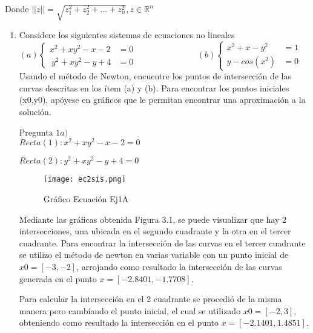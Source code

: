 \documentclass{udpreport}
\begin{document}
        Donde $||z||=\sqrt{z_{1}^{2} + z_{2}^2+...+z_{n}^{2}} , z \in \mathbb{R}^{n}$
    \begin{enumerate}   
        
        \item Considere los siguientes sistemas de ecuaciones no lineales\\
        
        \begin{math}
            (a)\left\lbrace
          \begin{array}{ll}
                x^2 + xy^2-x-2&=0 \\\
                y^2 + xy^2-y+4&=0
            \end{array}
            \right.
            \hspace{3cm}
            (b) \left\lbrace
           \begin{array}{ll}
                 x^2+x-y^2&=1  \\
                 y-cos(x^2)&=0 
            \end{array}
            \right.
        \end{math}\\
        
        Usando el método de Newton, encuentre los puntos de intersección de las curvas descritas en los ítem (a) y (b). Para encontrar los puntos iniciales (x0,y0), apóyese en gráficos que le permitan encontrar una aproximación a la solución.
        
        
        Pregunta $ 1a) $\\
        
            
            $ Recta(1) : x^2+xy^2-x-2=0 $
            
            $ Recta(2) : y^2 +xy^2-y+4=0 $
            
            \begin{figure}[h]
                \centering
                \texttt{[image: ec2sis.png]}
                 \caption{Gráfico Ecuación Ej1A}
            \end{figure}
            
            
            Mediante las gráficas obtenida Figura 3.1, se puede visualizar que hay 2 intersecciones, una ubicada en el segundo cuadrante y la otra en el tercer cuadrante. Para encontrar la intersección de las curvas en el tercer cuadrante se utilizo el método de newton en varias variable con un punto inicial de $x0=[-3,-2]$, arrojando como resultado la intersección de las curvas generada en el punto $x=[-2.8401,-1.7708]$.\par Para calcular la intersección en el 2 cuadrante se procedió de la misma manera pero cambiando el punto inicial, el cual se utilizado  $x0=[-2,3]$, obteniendo como resultado la intersección en el punto $x=[-2.1401,1.4851]$.


\end{enumerate}
\end{document}
